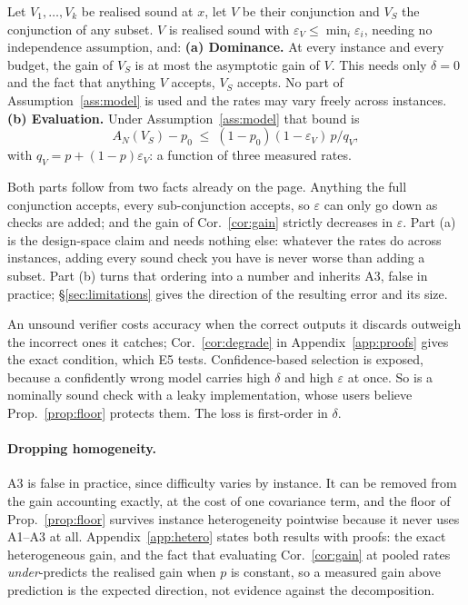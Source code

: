 \documentclass[11pt]{article}
\begin{document}
\begin{corollary}\label{cor:ceiling}\label{prop:stack}
Let $V_1,\dots,V_k$ be realised sound at $x$, let $V$ be their conjunction and
$V_S$ the conjunction of any subset. $V$ is realised sound with
$\varepsilon_V\le\min_i\varepsilon_i$, needing no independence assumption, and:
\textbf{(a) Dominance.} At every instance and every budget, the gain of $V_S$ is
at most the asymptotic gain of $V$. This needs only $\delta=0$ and the fact that
anything $V$ accepts, $V_S$ accepts. No part of Assumption~\ref{ass:model} is
used and the rates may vary freely across instances.
\textbf{(b) Evaluation.} Under Assumption~\ref{ass:model} that bound is
\[
A_N(V_S)-p_0\;\le\;(1-p_0)(1-\varepsilon_V)\,p/q_V ,
\]
with $q_V=p+(1-p)\varepsilon_V$:
a function of three measured rates.
\end{corollary}

Both parts follow from two facts already on the page. Anything the full
conjunction accepts, every sub-conjunction accepts, so $\varepsilon$ can only go
down as checks are added; and the gain of Cor.~\ref{cor:gain} strictly decreases
in $\varepsilon$. Part (a) is the design-space claim and needs nothing else:
whatever the rates do across instances, adding every sound check you have is
never worse than adding a subset. Part (b) turns that ordering into a number and
inherits A3, false in practice; \S\ref{sec:limitations} gives the
direction of the resulting error and its size.

An unsound verifier costs accuracy when the correct outputs it discards outweigh
the incorrect ones it catches; Cor.~\ref{cor:degrade} in Appendix~\ref{app:proofs}
gives the exact condition, which E5 tests. Confidence-based selection is exposed,
because a confidently wrong model carries high $\delta$ and high $\varepsilon$ at
once. So is a nominally sound check with a leaky implementation, whose users
believe Prop.~\ref{prop:floor} protects them. The loss is first-order in
$\delta$.

\paragraph{Dropping homogeneity.}
A3 is false in practice, since difficulty varies by instance. It can be removed
from the gain accounting exactly, at the cost of one covariance term, and the
floor of Prop.~\ref{prop:floor} survives instance heterogeneity pointwise
because it never uses A1--A3 at all. Appendix~\ref{app:hetero} states both
results with proofs: the exact heterogeneous gain, and the fact that evaluating
Cor.~\ref{cor:gain} at pooled rates \emph{under}-predicts the realised gain when
$p$ is constant, so a measured gain above prediction is the expected direction, not evidence
against the decomposition.
\end{document}
